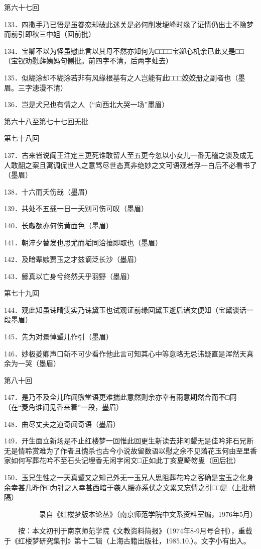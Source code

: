 第六十七回

133．四撒手乃已悟是虽眷恋却破此迷关是必何削发埂峰时缘了证情仍出士不隐梦而前引即秋三中姐{（\kaishu 回前批）}

134．宝卿不以为怪虽慰此言以其母不然亦知何为□□□□宝卿心机余已此又是□□{（\kaishu 宝钗劝慰薛姨妈句侧批。前四字不清，后两字蛀去）}

135．似糊涂却不糊涂若非有风缘根基有之人岂能有此□□□姣姣册之副者也{（\kaishu 墨眉。三字漶漫不清）}

136．岂是犬兄也有情之人{（\kaishu ``向西北大哭一场''墨眉）}

第六十八至第七十七回无批

第七十八回

137．古来皆说阎王注定三更死谁敢留人至五更今忽以小女儿一番无稽之谈及成无人敢翻之案且寓调侃世人之意骂尽世态真非绝妙之文可语观者浮一白后不必看书了{（\kaishu 墨眉）}

138．十六而夭伤哉{（\kaishu 墨眉）}

139．共处不五载一日一夭别可伤可叹{（\kaishu 墨眉）}

140．长顑额亦何伤黄面色{（\kaishu 墨眉）}

141．朝淬夕替发也思尤而垢同洽攘即取也{（\kaishu 墨眉）}

142．及暗辈嫉贾玉之才兹谪泛长沙{（\kaishu 墨眉）}

143．鲧真以亡身兮终然夭乎羽野{（\kaishu 墨眉）}

第七十九回

144．观此知虽诔晴雯实乃诔黛玉也试观证前缘回黛玉逝后诸文便知{（\kaishu 宝黛谈话一段墨眉）}

145．先为对景悼颦儿作引{（\kaishu 墨眉）}

146．妙极菱卿声口斩不可少看作他此言可知其心中等意略无忌讳疑直是浑然天真余为一哭{（\kaishu 墨眉）}

第八十回

147．是乃不及全儿昨闻煦堂语更难揣此意然则余亦幸有雨意期然合而不□同{（\kaishu 在``菱角谁闻见香来着''一段，墨眉）}

148．曲尽丈夫之道奇闻奇语{（\kaishu 墨眉）}

149．开生面立新场是不止红楼梦一回惟此回更生新读去非阿颦无是佳吟非石兄断无是情聆赏难为了作者且愧杀也古今小说故留数语以慰之余不见落花玉何由至里香家如何写葬花吟不至石头记埋香无闲字闲文□正如此丁亥夏畸笏叟{（\kaishu 回后批）}

150．玉兄生性之一天真颦又之知己外无一玉兄人思阻葬花吟之客确是宝玉之化身余幸甚几昨作□为针之人幸甚西暗于袭人腰亦系伏之文累又忘情之引□□是{（\kaishu 上批稍隔）}

{　　　　　录自《红楼梦版本论丛》（南京师范学院中文系资料室编，1976年5月）}

{　　按：本文初刊于南京师范学院《文教资料简报》（1974年8-9月号合刊），重载于《红楼梦研究集刊》第十二辑（上海古籍出版社，1985.10.）。文字小有出入。}
